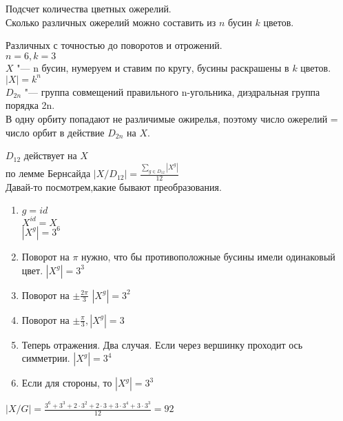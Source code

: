\begin{exmp}
Подсчет количества цветных ожерелий.\\
Сколько различных ожерелий можно составить из
$n$ бусин $k$ цветов.

Различных с точностью до поворотов и отрожений.\\ 
$n = 6, k = 3$\\

$X$ "--- n бусин, нумеруем и ставим по кругу, бусины раскрашены в $k$ цветов.\\
$|X| = k^n$\\

$D_{2n}$ "--- группа совмещений правильного n-угольника, 
диэдральная группа порядка 2n.\\
В одну орбиту попадают не различимые ожирелья, поэтому 
число ожерелий = число орбит в действие $D_{2n}$ на $X$.

$D_{12}$ действует на $X$\\
по лемме Бернсайда $|X/D_{12}| = \frac{\sum_{g \in D_{12}}|X^g|}{12}$\\

Давай-то посмотрем,какие бывают преобразования. 
\begin{enumerate}
\item $g = id$\\
$X^{id} = X$\\
$|X^g| = 3^6$\\
\item 
Поворот на $\pi$ нужно, что бы противоположные бусины имели одинаковый цвет. $|X^g| = 3^3$
\item
Поворот на $\pm \frac{2\pi}{3}$  $|X^g| = 3^2$\\
\item
Поворот на $\pm \frac{\pi}{3}, |X^g| = 3$
\item
Теперь отражения.
Два случая. Если через вершинку проходит ось симметрии. 
$|X^g| = 3^4$ \\
\item
Если для стороны, то 
$|X^g| = 3^3$\\
\end{enumerate}

$|X/G| = \frac{3^6 + 3^3 + 2\cdot 3^2 + 2\cdot 3 + 3 \cdot 3^4 + 3 \cdot 3^3}{12} = 92$
\end{exmp}